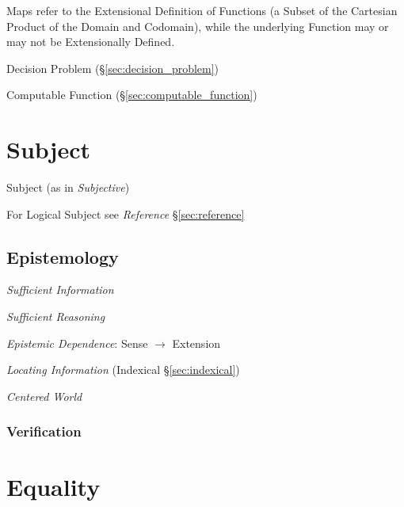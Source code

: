 Maps refer to the Extensional Definition of Functions (a Subset of the
Cartesian Product of the Domain and Codomain), while the underlying
Function may or may not be Extensionally Defined.

Decision Problem (\S\ref{sec:decision_problem})

Computable Function (\S\ref{sec:computable_function})



\section{Subject}\label{sec:subject}

Subject (as in \emph{Subjective})

For Logical Subject see \emph{Reference} \S\ref{sec:reference}



\subsection{Epistemology}\label{sec:epistemology}
\cite{chalmers02}

\emph{Sufficient Information}

\emph{Sufficient Reasoning}

\emph{Epistemic Dependence}: Sense $\rightarrow$ Extension

\emph{Locating Information} (Indexical \S\ref{sec:indexical})

\emph{Centered World}



\subsubsection{Verification}\label{sec:verification}



\section{Equality}\label{sec:equality}\cite{baez15}

